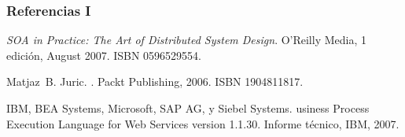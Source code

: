 \begin{frame}
  \frametitle{Referencias I}

\begin{thebibliography}{10}
{\em {SOA in Practice: The Art of Distributed System Design}\/}.
\newblock O'Reilly Media, 1 edici\'on, August 2007.
\newblock ISBN 0596529554.


Matjaz~B. Juric.
.
\newblock Packt Publishing, 2006.
\newblock ISBN 1904811817.


IBM, BEA Systems, Microsoft, SAP AG, y Siebel Systems.
usiness {P}rocess {E}xecution {L}anguage for {W}eb {S}ervices
  version 1.1.30.
\newblock Informe t\'ecnico, IBM, 2007.



% 
% 
% 



% 
% 
% 
% 

% 
% 
% 
% 
% 



\end{thebibliography}
\end{frame}

